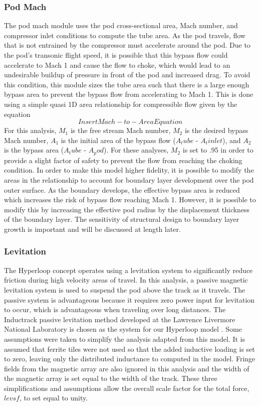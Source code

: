 \subsubsection{Pod Mach}
The pod mach module uses the pod cross-sectional area, Mach number, and compressor inlet conditions to compute the tube area. As the pod travels, flow that is not entrained by the compressor must accelerate around the pod. Due to the pod’s transonic flight speed, it is possible that this bypass flow could accelerate to Mach 1 and cause the flow to choke, which would lead to an undesirable buildup of pressure in front of the pod and increased drag. To avoid this condition, this module sizes the tube area such that there is a large enough bypass area to prevent the bypass flow from accelerating to Mach 1. This is done using a simple quasi 1D area relationship for compressible flow given by the equation
\begin{equation}
	\label{eq:mach_to_area}
	Insert Mach-to-Area Equation
\end{equation}
For this analysis, $M_1$ is the free stream Mach number, $M_2$ is the desired bypass Mach number, $A_1$ is the initial area of the bypass flow ($A_tube$ - $A_tinlet$), and $A_2$ is the bypass area ($A_tube$ - $A_pod$). For these analyses, $M_2$ is set to .95 in order to provide a slight factor of safety to prevent the flow from reaching the choking condition.
In order to make this model higher fidelity, it is possible to modify the areas in the relationship to account for boundary layer development over the pod outer surface. As the boundary develops, the effective bypass area is reduced which increases the risk of bypass flow reaching Mach 1. However, it is possible to modify this by increasing the effective pod radius by the displacement thickness of the boundary layer. The sensitivity of structural design to boundary layer growth is important and will be discussed at length later.
\subsubsection{Levitation}
The Hyperloop concept operates using a levitation system to significantly reduce friction during high velocity areas of travel. In this analysis, a passive magnetic levitation system is used to suspend the pod above the track as it travels. The passive system is advantageous because it requires zero power input for levitation to occur, which is advantageous when traveling over long distances. The Inductrack passive levitation method developed at the Lawrence Livermore National Laboratory is chosen as the system for our Hyperloop model \cite{inductrack}. Some assumptions were taken to simplify the analysis adapted from this model. It is assumed that ferrite tiles were not used so that the added inductive loading is set to zero, leaving only the distributed inductance to computed in the model. Fringe fields from the magnetic array are also ignored in this analysis and the width of the magnetic array is set equal to the width of the track. These three simplifications and assumptions allow the overall scale factor for the total force, $levsf$, to set equal to unity.

